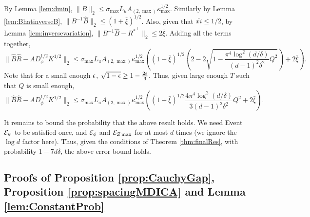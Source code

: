 By Lemma \ref{lem:dmin}, 
 $ \|B\|_2 \le \sigma_{\max}L_uA_{(2,\max)}\kappa_{\max}^{1/2}$. 
Similarly by Lemma \ref{lem:BhatinverseB}, $\| B^{-1}\hat{B}\|_2 \le (1+\bar{\xi})^{1/2}$. 
Also, given that $\bar{xi} \le 1/2$, by Lemma \ref{lem:inversevariation}, $\|B^{-1}\hat{B} -{R^*}^{\top}\|_2 \le 2\bar{\xi}$.
Adding all the terms together,
\[
\| \hat{B}\hat{R} - AD_{\phi}^{1/2}K^{1/2}\|_2 \le \sigma_{\max}L_uA_{(2,\max)}\kappa_{\max}^{1/2}\left((1+\bar{\xi})^{1/2}\left(  2 - 2\sqrt{1-\frac{\pi^4 \log^2(d/\delta)}{(d-1)^2\delta^2} Q^2}\right) + 2\bar{\xi}\right).
\] 
Note that for a small enough $\epsilon$, $\sqrt{1-\epsilon} \ge 1-\frac{2\epsilon}{3}$. Thus, given large enough $T$ such that $Q$ is small enough,
\[
\| \hat{B}\hat{R} - AD_{\phi}^{1/2}K^{1/2}\|_2 \le \sigma_{\max}L_uA_{(2,\max)}\kappa_{\max}^{1/2}\left((1+\bar{\xi})^{1/2}\frac{4\pi^4 \log^2(d/\delta)}{3(d-1)^2\delta^2} Q^2+ 2\bar{\xi}\right).
\]

It remains to bound the probability that the above result holds.
We need Event $\mathcal{E}_{\psi}$ to be satisfied once, and $\mathcal{E}_{\phi}$ and $\mathcal{E}_{Z\max}$ for at most $d$ times (we ignore the $\log d$ factor here). 
Thus, given the conditions of Theorem \ref{thm:finalRes}, with probability $1-7d\delta$, the above error bound holds. 

\subsection{Proofs of Proposition \ref{prop:CauchyGap}, Proposition \ref{prop:spacingMDICA} and Lemma \ref{lem:ConstantProb}}
\label{sec:events}

